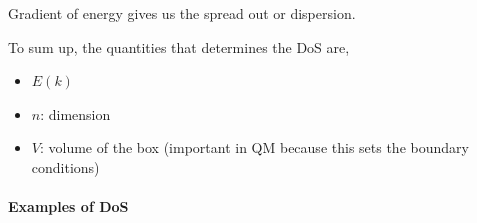 \documentclass[letterpaper,10pt,english]{sphinxmanual}
\begin{document}
Gradient of energy gives us the spread out or dispersion.

To sum up, the quantities that determines the DoS are,
\begin{itemize}
\item {} 
$E(k)$

\item {} 
$n$: dimension

\item {} 
$V$: volume of the box (important in QM because this sets the boundary conditions)

\end{itemize}


\paragraph{Examples of DoS}
\end{document}
